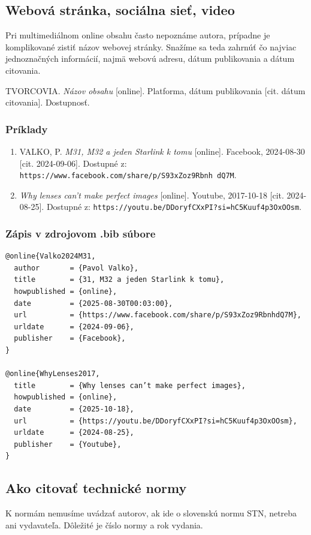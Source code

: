 \subsection{Webová stránka, sociálna sieť, video}
Pri multimediálnom online obsahu často nepoznáme autora,
prípadne je komplikované zistiť názov webovej stránky.
Snažíme sa teda zahrnúť čo najviac jednoznačných informácií, 
najmä webovú adresu, dátum publikovania a dátum citovania.
\begin{trivlist}
  \item TVORCOVIA. \textit{Názov obsahu} [online]. Platforma, dátum publikovania [cit. dátum citovania]. Dostupnosť.
\end{trivlist}

\subsubsection*{\normalsize Príklady}
\begin{enumerate}
  \item VALKO, P. \textit{M31, M32 a jeden Starlink k tomu} [online]. Facebook, 2024-08-30 [cit. 2024-09-06]. Dostupné z: \texttt{https://www.facebook.com/share/p/S93xZoz9Rbnh
  dQ7M}.
  
  \item \textit{Why lenses can't make perfect images} [online]. Youtube, 2017-10-18 [cit. 2024-08-25]. Dostupné z: \texttt{https://youtu.be/DDoryfCXxPI?si=hC5Kuuf4p3OxOOsm}.
\end{enumerate}

\subsubsection*{\normalsize Zápis v zdrojovom .bib súbore}
\begin{verbatim}
@online{Valko2024M31,
  author       = {Pavol Valko},
  title        = {31, M32 a jeden Starlink k tomu},
  howpublished = {online},
  date         = {2025-08-30T00:03:00},
  url          = {https://www.facebook.com/share/p/S93xZoz9RbnhdQ7M},
  urldate      = {2024-09-06},
  publisher    = {Facebook},
}

@online{WhyLenses2017,
  title        = {Why lenses can’t make perfect images},
  howpublished = {online},
  date         = {2025-10-18},
  url          = {https://youtu.be/DDoryfCXxPI?si=hC5Kuuf4p3OxOOsm},
  urldate      = {2024-08-25},
  publisher    = {Youtube},
}
\end{verbatim}

\subsection{Ako citovať technické normy}
K normám nemusíme uvádzať autorov, ak ide o slovenskú normu STN, netreba ani vydavateľa. Dôležité je číslo normy a rok vydania.

